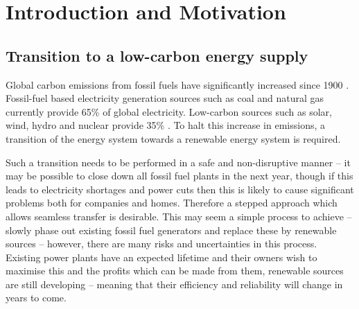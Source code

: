 \section{Introduction and Motivation}


\subsection{Transition to a low-carbon energy supply}

Global carbon emissions from fossil fuels have significantly increased since 1900 \cite{boden2017global}.    Fossil-fuel based electricity generation sources such as coal and natural gas currently provide 65\% of global electricity. Low-carbon sources such as solar, wind, hydro and nuclear provide 35\% \cite{BP2018}. To halt this increase in  emissions, a transition of the energy system towards a renewable energy system is required. 





Such a transition needs to be performed in a safe and non-disruptive manner -- it may be possible to close down all fossil fuel plants in the next year, though if this leads to electricity shortages and power cuts then this is likely to cause significant problems both for companies and homes. Therefore a stepped approach which allows seamless transfer is desirable. This may seem a simple process to achieve -- slowly phase out existing fossil fuel generators and replace these by renewable sources -- however, there are many risks and uncertainties in this process. Existing power plants have an expected lifetime and their owners wish to maximise this and the profits which can be made from them, renewable sources are still developing -- meaning that their efficiency and reliability will change in years to come.

